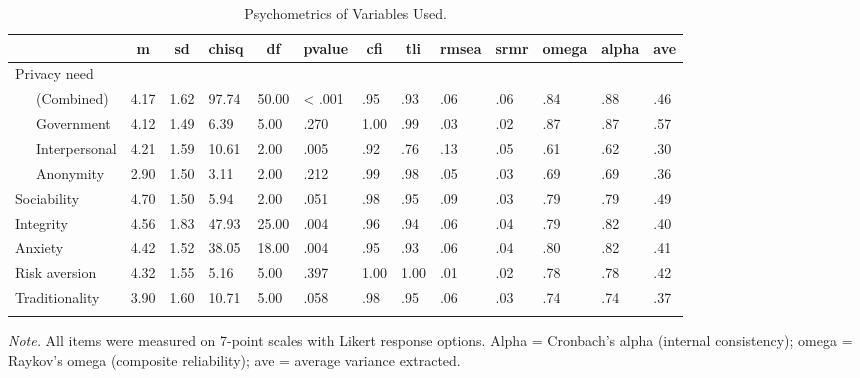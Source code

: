 \documentclass[man,floatsintext]{apa6}
\begin{document}
\begin{table}[tbp]
\begin{center}
\begin{threeparttable}
\caption{\label{tab:psychometrics}Psychometrics of Variables Used.}
\footnotesize{
\begin{tabular}{lllllllllllll}
\toprule
 & \multicolumn{1}{c}{m} & \multicolumn{1}{c}{sd} & \multicolumn{1}{c}{chisq} & \multicolumn{1}{c}{df} & \multicolumn{1}{c}{pvalue} & \multicolumn{1}{c}{cfi} & \multicolumn{1}{c}{tli} & \multicolumn{1}{c}{rmsea} & \multicolumn{1}{c}{srmr} & \multicolumn{1}{c}{omega} & \multicolumn{1}{c}{alpha} & \multicolumn{1}{c}{ave}\\
\midrule
Privacy need &  &  &  &  &  &  &  &  &  &  &  & \\
\ \ \ (Combined) & 4.17 & 1.62 & 97.74 & 50.00 & < .001 & .95 & .93 & .06 & .06 & .84 & .88 & .46\\
\ \ \ Government & 4.12 & 1.49 & 6.39 & 5.00 & .270 & 1.00 & .99 & .03 & .02 & .87 & .87 & .57\\
\ \ \ Interpersonal & 4.21 & 1.59 & 10.61 & 2.00 & .005 & .92 & .76 & .13 & .05 & .61 & .62 & .30\\
\ \ \ Anonymity & 2.90 & 1.50 & 3.11 & 2.00 & .212 & .99 & .98 & .05 & .03 & .69 & .69 & .36\\
Sociability & 4.70 & 1.50 & 5.94 & 2.00 & .051 & .98 & .95 & .09 & .03 & .79 & .79 & .49\\
Integrity & 4.56 & 1.83 & 47.93 & 25.00 & .004 & .96 & .94 & .06 & .04 & .79 & .82 & .40\\
Anxiety & 4.42 & 1.52 & 38.05 & 18.00 & .004 & .95 & .93 & .06 & .04 & .80 & .82 & .41\\
Risk aversion & 4.32 & 1.55 & 5.16 & 5.00 & .397 & 1.00 & 1.00 & .01 & .02 & .78 & .78 & .42\\
Traditionality & 3.90 & 1.60 & 10.71 & 5.00 & .058 & .98 & .95 & .06 & .03 & .74 & .74 & .37\\
\bottomrule
\addlinespace
\end{tabular}
}
\begin{tablenotes}[para]
\normalsize{\textit{Note.} All items were measured on 7-point scales with Likert response options. Alpha = Cronbach's alpha (internal consistency); omega = Raykov's omega (composite reliability); ave = average variance extracted.}
\end{tablenotes}
\end{threeparttable}
\end{center}
\end{table}
\end{document}
